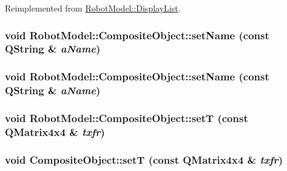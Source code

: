 Reimplemented from \hyperlink{class_robot_model_1_1_display_list_a7d52ea010f54755bcb3bfae9e26dd0c2}{RobotModel::DisplayList}.\hypertarget{class_robot_model_1_1_composite_object_a02a2c1ee58297a6ea0131fa808498a49}{
\subsubsection[{setName}]{\setlength{\rightskip}{0pt plus 5cm}void RobotModel::CompositeObject::setName (const QString \& {\em aName})}}
\label{class_robot_model_1_1_composite_object_a02a2c1ee58297a6ea0131fa808498a49}
\hypertarget{class_robot_model_1_1_composite_object_a02a2c1ee58297a6ea0131fa808498a49}{
\subsubsection[{setName}]{\setlength{\rightskip}{0pt plus 5cm}void RobotModel::CompositeObject::setName (const QString \& {\em aName})}}
\label{class_robot_model_1_1_composite_object_a02a2c1ee58297a6ea0131fa808498a49}
\hypertarget{class_robot_model_1_1_composite_object_a9637a9594fc63f51e24bd620ec4b3792}{
\subsubsection[{setT}]{\setlength{\rightskip}{0pt plus 5cm}void RobotModel::CompositeObject::setT (const QMatrix4x4 \& {\em txfr})}}
\label{class_robot_model_1_1_composite_object_a9637a9594fc63f51e24bd620ec4b3792}
\hypertarget{class_robot_model_1_1_composite_object_abd48ac40b21178f5306ddfa6c92ea3c3}{
\subsubsection[{setT}]{\setlength{\rightskip}{0pt plus 5cm}void CompositeObject::setT (const QMatrix4x4 \& {\em txfr})}}

